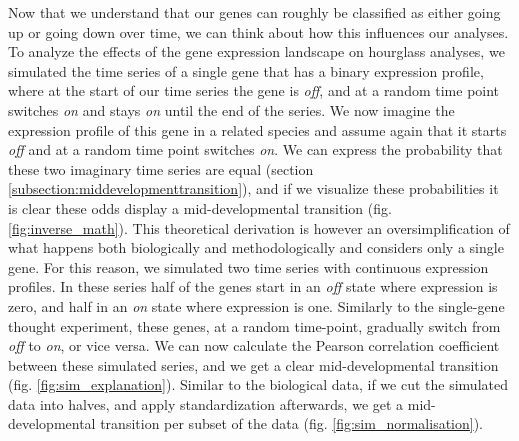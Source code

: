 Now that we understand that our genes can roughly be classified as either going up or going down over time, we can think about how this influences our analyses. To analyze the effects of the gene expression landscape on hourglass analyses, we simulated the time series of a single gene that has a binary expression profile, where at the start of our time series the gene is \textit{off}, and at a random time point switches \textit{on} and stays \textit{on} until the end of the series. We now imagine the expression profile of this gene in a related species and assume again that it starts \textit{off} and at a random time point switches \textit{on}. We can express the probability that these two imaginary time series are equal (section \ref{subsection:middevelopmenttransition}), and if we visualize these probabilities it is clear these odds display a mid-developmental transition (fig. \ref{fig:inverse_math}). This theoretical derivation is however an oversimplification of what happens both biologically and methodologically and considers only a single gene. For this reason, we simulated two time series with continuous expression profiles. In these series half of the genes start in an \textit{off} state where expression is zero, and half in an \textit{on} state where expression is one. Similarly to the single-gene thought experiment, these genes, at a random time-point, gradually switch from \textit{off} to \textit{on}, or vice versa. We can now calculate the Pearson correlation coefficient between these simulated series, and we get a clear mid-developmental transition (fig. \ref{fig:sim_explanation}). Similar to the biological data, if we cut the simulated data into halves, and apply standardization afterwards, we get a mid-developmental transition per subset of the data (fig. \ref{fig:sim_normalisation}). 

